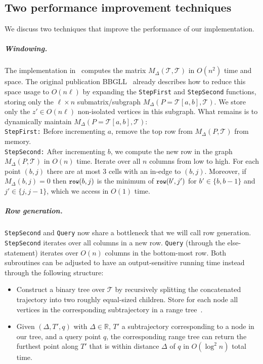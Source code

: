 \documentclass[11pt]{article}
\newcommand{\minrow}{\texttt{\small row}}
\begin{document}
\subsection{Two performance improvement techniques}
\label{sub:improvement}
%
We discuss two techniques that improve the performance of our implementation. 
%
\subparagraph{Windowing. }
The implementation in~\cite{movetk} computes the matrix $M_\Delta(\mathcal{T}, \mathcal{T})$ in $O(n^2)$ time and space. 
The original publication BBGLL~\cite{buchin2011detecting} already describes how to reduce this space usage to $O(n \ell)$ by expanding the \texttt{StepFirst} and \texttt{StepSecond} functions, storing only the $\ell \times n$ submatrix/subgraph $M_\Delta(P = \mathcal{T}[a, b], \mathcal{T})$. 
We store only the $z' \in O(n \ell)$ non-isolated vertices in this subgraph. What remains is to dynamically maintain  $M_\Delta(P = \mathcal{T}[a, b], \mathcal{T})$: \\
%
\texttt{StepFirst:}
Before incrementing $a$, remove the top row from $M_\Delta(P, \mathcal{T})$ from memory. \\ 
%
\texttt{StepSecond:}
After incrementing $b$, we compute the new row in the graph $M_\Delta(P, \mathcal{T})$ in $O(n)$ time. 
Iterate over all $n$ columns from low to high.  For each point $(b, j)$ there are at most $3$ cells with an in-edge to $(b, j)$. Moreover, if $M_\Delta(b, j) = 0$ then $\minrow(b, j)$ is the minimum of  $\minrow(b', j')$ for $b' \in \{b, b-1 \}$ and $j' \in \{j, j-1 \}$, which we access in $O(1)$ time. 
%
%
%
%
    \subparagraph{Row generation.}
    \texttt{StepSecond} and \texttt{Query} now share a bottleneck that we will call row generation. 
    \texttt{StepSecond} iterates over all columns in a new row. 
    \texttt{Query} (through the else-statement) iterates over $O(n)$ columns in the bottom-most row. Both subroutines can be adjusted to have an output-sensitive running time instead through the following structure:
%
\begin{itemize}
    \item    Construct a binary tree over $\mathcal{T}$ by recursively {splitting} the concatenated trajectory into two roughly equal-sized children. 
    Store for each node all vertices in the corresponding subtrajectory in a range tree~\cite{DBLP:books/lib/BergCKO08}. 
    \item     Given $(\Delta, T', q)$ with $\Delta \in \mathbb{R}$, $T'$ a subtrajectory corresponding to a node in our tree, and a query point $q$, the corresponding range tree can return the furthest point along $T'$ that is within distance $\Delta$ of $q$ in $O(\log^2 n)$ total time. 
\end{itemize}
\end{document}
